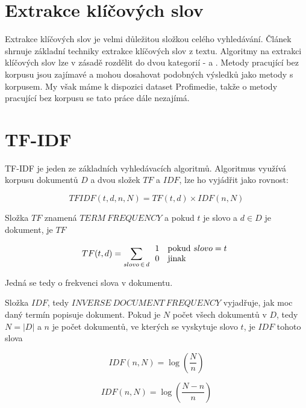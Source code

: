 \section{Extrakce klíčových slov}

Extrakce klíčových slov je velmi důležitou složkou celého vyhledávání. Článek \cite{lott} shrnuje základní techniky extrakce klíčových slov z textu. Algoritmy na extrakci klíčových slov lze v zásadě rozdělit do dvou kategorií -  a . Metody pracující bez korpusu jsou zajímavé a mohou dosahovat podobných výsledků jako metody s korpusem. My však máme k dispozici dataset Profimedie, takže o metody pracující bez korpusu se tato práce dále nezajímá. 

\section{TF-IDF}

TF-IDF je jeden ze základních vyhledávacích algoritmů. Algoritmus využívá korpusu dokumentů $D$ a dvou složek $TF$ a $IDF$, lze ho vyjádřit jako rovnost: 

\begin{equation}
  TFIDF(t,d,n,N)= TF(t,d)\times IDF(n,N)
\end{equation}

Složka $TF$ znamená $TERM\ FREQUENCY$ a pokud $t$ je slovo a $d \in D$ je dokument, je $TF$

\begin{equation}
 TF(t,d) = \sum_{slovo\,\in\,d} \begin{array}{l l} 1 & \mathrm{pokud}\ slovo = t \\
  0 & \mathrm{jinak} \end{array}
\end{equation}

Jedná se tedy o frekvenci slova v dokumentu.

Složka $IDF$, tedy $INVERSE\ DOCUMENT\ FREQUENCY$ vyjadřuje, jak moc daný termín popisuje dokument. Pokud je $N$ počet všech dokumentů v $D$, tedy $N = |D|$ a $n$ je počet dokumentů, ve kterých se vyskytuje slovo $t$, je $IDF$ tohoto slova

\begin{equation}
IDF(n,N) = \log \left(\frac{N}{n}\right)
\end{equation}

\begin{equation}
IDF(n,N) = \log \left(\frac{N - n}{n}\right)
\end{equation}

